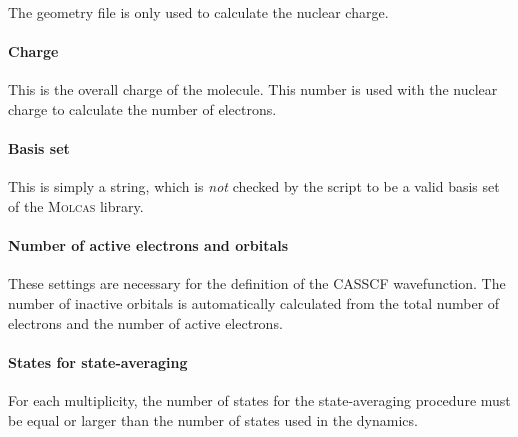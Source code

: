 \documentclass[a4paper,11pt,DIV=15,openany,twoside=false]{scrbook}
\begin{document}
The geometry file is only used to calculate the nuclear charge.

\paragraph{Charge}

This is the overall charge of the molecule. This number is used with the nuclear charge to calculate the number of electrons.

\paragraph{Basis set}

This is simply a string, which is \textit{not} checked by the script to be a valid basis set of the \textsc{Molcas} library.

\paragraph{Number of active electrons and orbitals}

These settings are necessary for the definition of the CASSCF wavefunction. The number of inactive orbitals is automatically calculated from the total number of electrons and the number of active electrons.

\paragraph{States for state-averaging}

For each multiplicity, the number of states for the state-averaging procedure must be equal or larger than the number of states used in the dynamics.
\end{document}
